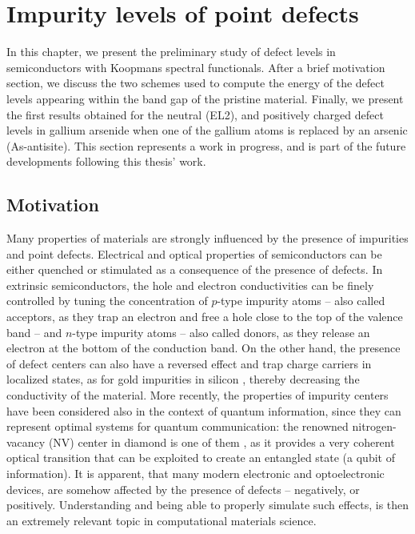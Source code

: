 \cleardoublepage
\chapter{Impurity levels of point defects\label{ch:defects}}
In this chapter, we present the preliminary study of defect levels in semiconductors with Koopmans spectral functionals. After a brief motivation section, we discuss the two schemes used to compute the energy of the defect levels appearing within the band gap of the pristine material. Finally, we present the first results obtained for the neutral (EL2), and positively charged defect levels in gallium arsenide when one of the gallium atoms is replaced by an arsenic (As-antisite). This section represents a work in progress, and is part of the future developments following this thesis' work.

\clearpage
\section{Motivation\label{sec:motivation-defects}}
Many properties of materials are strongly influenced by the presence of impurities and point defects. Electrical and optical properties of semiconductors can be either quenched or stimulated as a consequence of the presence of defects. In extrinsic semiconductors, the hole and electron conductivities can be finely controlled by tuning the concentration of $p$-type impurity atoms -- also called acceptors, as they trap an electron and free a hole close to the top of the valence band -- and $n$-type impurity atoms -- also called donors, as they release an electron at the bottom of the conduction band. On the other hand, the presence of defect centers can also have a reversed effect and trap charge carriers in localized states, as for gold impurities in silicon \cite{corsetti_negative-u_2014}, thereby decreasing the conductivity of the material. More recently, the properties of impurity centers have been considered also in the context of quantum information, since they can represent optimal systems for quantum communication: the renowned nitrogen-vacancy (NV) center in diamond is one of them \cite{maze_properties_2011}, as it provides a very coherent optical transition that can be exploited to create an entangled state (a qubit of information). It is apparent, that many modern electronic and optoelectronic devices, are somehow affected by the presence of defects -- negatively, or positively. Understanding and being able to properly simulate such effects, is then an extremely relevant topic in computational materials science.

